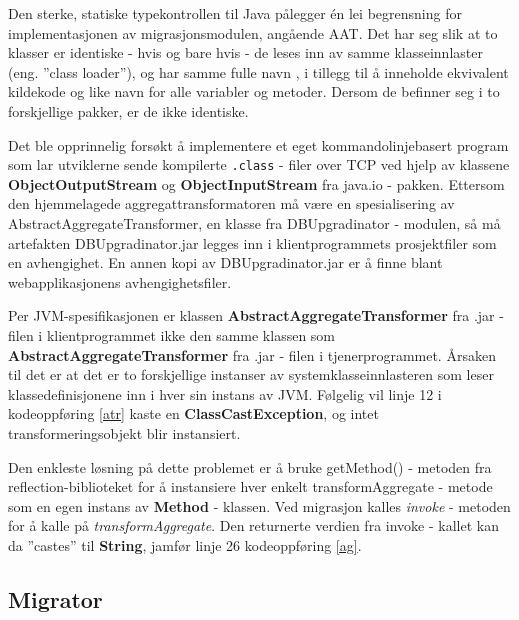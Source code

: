 Den sterke, statiske typekontrollen til Java pålegger én lei begrensning for implementasjonen av migrasjonsmodulen, angående AAT. Det har seg slik at to klasser er identiske - hvis og bare hvis - de leses inn av samme klasseinnlaster (eng. ''class loader''), og har samme fulle navn \citep{lindholm1999}, i tillegg til å inneholde ekvivalent kildekode og like navn for alle variabler og metoder. Dersom de befinner seg i to forskjellige pakker, er de ikke identiske.

Det ble opprinnelig forsøkt å implementere et eget kommandolinjebasert program som lar utviklerne sende kompilerte \texttt{.class} - filer over TCP ved hjelp av klassene \textbf{ObjectOutputStream} og \textbf{ObjectInputStream} fra java.io - pakken. Ettersom den hjemmelagede aggregattransformatoren må være en spesialisering av AbstractAggregateTransformer, en klasse fra DBUpgradinator - modulen, så må artefakten DBUpgradinator.jar legges inn i klientprogrammets prosjektfiler som en avhengighet. En annen kopi av DBUpgradinator.jar er å finne blant webapplikasjonens avhengighetsfiler.

Per JVM-spesifikasjonen er klassen \textbf{AbstractAggregateTransformer} fra .jar - filen i klientprogrammet ikke den samme klassen som \textbf{AbstractAggregateTransformer} fra .jar - filen i tjenerprogrammet. Årsaken til det er at det er to forskjellige instanser av systemklasseinnlasteren som leser klassedefinisjonene inn i hver sin instans av JVM. Følgelig vil linje 12 i kodeoppføring \ref{atr} kaste en \textbf{ClassCastException}, og intet transformeringsobjekt blir instansiert.

Den enkleste løsning på dette problemet er å bruke getMethod() - metoden fra reflection-biblioteket for å instansiere hver enkelt transformAggregate - metode som en egen instans av \textbf{Method} - klassen. Ved migrasjon kalles \emph{invoke} - metoden for å kalle på \emph{transformAggregate}. Den returnerte verdien fra invoke - kallet kan da ''castes'' til \textbf{String}, jamfør linje 26 kodeoppføring \ref{ag}.

\subsection{Migrator} \label{migrator}



